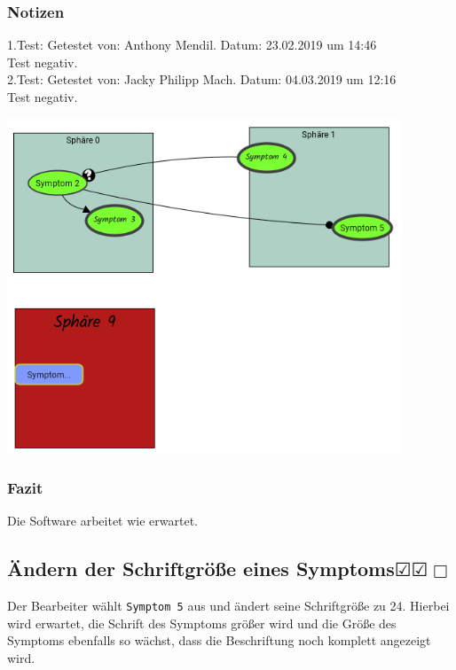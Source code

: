 \documentclass[enabledeprecatedfontcommands]{scrartcl}
\newcommand{\subsectiont}[2]{\subsection[#1]{#1{\normalsize\normalfont #2}}}
\newcommand{\leer}{$\Box$}
\newcommand{\ok}{$\CheckedBox$}
\begin{document}
\subsubsection{Notizen}
1.Test: Getestet von: Anthony Mendil. Datum: 23.02.2019 um 14:46 \\
Test negativ.\\
2.Test: Getestet von: Jacky Philipp Mach. Datum: 04.03.2019 um 12:16 \\
Test negativ.
\begin{center}
\includegraphics[height=10cm]{2_29.PNG}
\end{center}
\subsubsection{Fazit}
Die Software arbeitet wie erwartet.

\subsectiont{Ändern der Schriftgröße eines Symptoms}{\dotfill\ok\ok\leer}
Der Bearbeiter wählt \texttt{Symptom 5} aus und ändert seine Schriftgröße zu 24. Hierbei wird erwartet, die Schrift des Symptoms größer wird und die Größe des Symptoms ebenfalls so wächst, dass die Beschriftung noch komplett angezeigt wird. 
\end{document}
